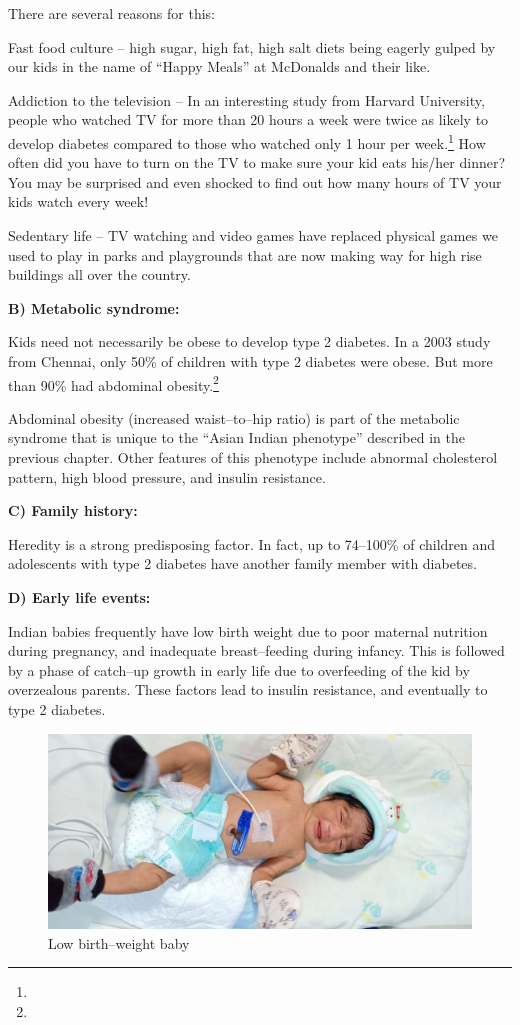 There are several reasons for this:

\item Fast food culture – high sugar, high fat, high salt diets being eagerly gulped by our kids in the name of “Happy Meals” at McDonalds and their like.

 \item Addiction to the television – In an interesting study from Harvard University, people who watched TV for more than 20 hours a week were twice as likely to develop diabetes compared to those who watched only 1 hour per week.\footnote{} How often did you have to turn on the TV to make sure your kid eats his/her dinner? You may be surprised and even shocked to find out how many hours of TV your kids watch every week!

 \item Sedentary life – TV watching and video games have replaced physical games we used to play in parks and playgrounds that are now making way for high rise buildings all over the country.

\textbf{B) Metabolic syndrome:}

Kids need not necessarily be obese to develop type 2 diabetes. In a 2003 study from Chennai, only 50\% of children with type 2 diabetes were obese. But more than 90\% had abdominal obesity.\footnote{}

Abdominal obesity (increased waist–to–hip ratio) is part of the metabolic syndrome that is unique to the “Asian Indian phenotype” described in the previous chapter. Other features of this phenotype include abnormal cholesterol pattern, high blood pressure, and insulin resistance.

\textbf{C) Family history:}

Heredity is a strong predisposing factor. In fact, up to 74–100\% of children and adolescents with type 2 diabetes have another family member with diabetes.

\textbf{D) Early life events:}

Indian babies frequently have low birth weight due to poor maternal nutrition during pregnancy, and inadequate breast–feeding during infancy. This is followed by a phase of catch–up growth in early life due to overfeeding of the kid by overzealous parents. These factors lead to insulin resistance, and eventually to type 2 diabetes.

\begin{figure}
\includegraphics{images/025.jpg}
\caption{Low birth–weight baby}
\end{figure}


